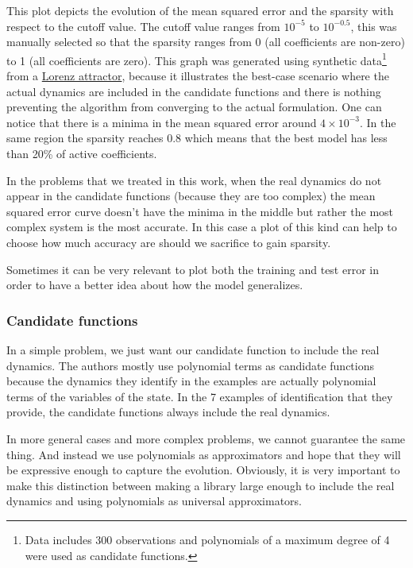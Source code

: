 \documentclass[12pt, letterpaper]{article}
\begin{document}
This plot depicts the evolution of the mean squared error and the sparsity with respect to the cutoff value.
The cutoff value ranges from $10^{-5}$ to $10^{-0.5}$, this was manually selected so that the sparsity ranges from 0 (all coefficients are non-zero) to 1 (all coefficients are zero).
This graph was generated using synthetic data\footnote{Data includes 300 observations and polynomials of a maximum degree of 4 were used as candidate functions.} from a \href{https://en.wikipedia.org/wiki/Lorenz_system}{Lorenz attractor}, because it illustrates the best-case scenario where the actual dynamics are included in the candidate functions and there is nothing preventing the algorithm from converging to the actual formulation.
One can notice that there is a minima in the mean squared error around $4 \times 10^{-3}$. In the same region the sparsity reaches 0.8 which means that the best model has less than 20\% of active coefficients.

In the problems that we treated in this work, when the real dynamics do not appear in the candidate functions (because they are too complex) the mean squared error curve doesn't have the minima in the middle but rather the most complex system is the most accurate. 
In this case a plot of this kind can help to choose how much accuracy are should we sacrifice to gain sparsity.

Sometimes it can be very relevant to plot both the training and test error in order to have a better idea about how the model generalizes.




\subsubsection{Candidate functions}\label{sec:polynomials}

In a simple problem, we just want our candidate function to include the real dynamics. 
The authors mostly use polynomial terms as candidate functions because the dynamics they identify in the examples are actually polynomial terms of the variables of the state. 
In the 7 examples of identification that they provide, the candidate functions always include the real dynamics. 

In more general cases and more complex problems, we cannot guarantee the same thing. 
And instead we use polynomials as approximators and hope that they will be expressive enough to capture the evolution. 
Obviously, it is very important to make this distinction between making a library large enough to include the real dynamics and using polynomials as universal approximators. 
\end{document}

